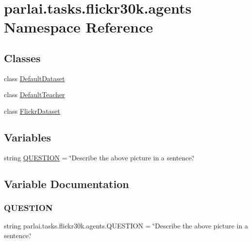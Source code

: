 \hypertarget{namespaceparlai_1_1tasks_1_1flickr30k_1_1agents}{}\section{parlai.\+tasks.\+flickr30k.\+agents Namespace Reference}
\label{namespaceparlai_1_1tasks_1_1flickr30k_1_1agents}
\subsection*{Classes}
\begin{DoxyCompactItemize}
\item 
class \hyperlink{classparlai_1_1tasks_1_1flickr30k_1_1agents_1_1DefaultDataset}{Default\+Dataset}
\item 
class \hyperlink{classparlai_1_1tasks_1_1flickr30k_1_1agents_1_1DefaultTeacher}{Default\+Teacher}
\item 
class \hyperlink{classparlai_1_1tasks_1_1flickr30k_1_1agents_1_1FlickrDataset}{Flickr\+Dataset}
\end{DoxyCompactItemize}
\subsection*{Variables}
\begin{DoxyCompactItemize}
\item 
string \hyperlink{namespaceparlai_1_1tasks_1_1flickr30k_1_1agents_af6a2b361765bec718f55428cd47fa64a}{Q\+U\+E\+S\+T\+I\+ON} = \char`\"{}Describe the above picture in a sentence.\char`\"{}
\end{DoxyCompactItemize}


\subsection{Variable Documentation}
\mbox{\label{namespaceparlai_1_1tasks_1_1flickr30k_1_1agents_af6a2b361765bec718f55428cd47fa64a}} 
\subsubsection{\texorpdfstring{Q\+U\+E\+S\+T\+I\+ON}{QUESTION}}
{\footnotesize\ttfamily string parlai.\+tasks.\+flickr30k.\+agents.\+Q\+U\+E\+S\+T\+I\+ON = \char`\"{}Describe the above picture in a sentence.\char`\"{}}

